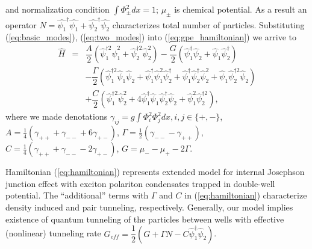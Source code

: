 \documentclass[aps, pre, preprint, groupedaddress, superscriptaddress, showkeys, showpacs] {revtex4-1}
\begin{document}
{{{%
%
and normalization condition $\int \Phi_{\pm}^2 dx = 1$; $\mu_{\pm}$ is chemical potential.
As a result an operator $N=\hat{\psi_1}^\dag\hat{\psi_1} + \hat{\psi_2}^\dag\hat{\psi_2}$ characterizes total number of particles.
Substituting (\ref{eq:basic_modes}), (\ref{eq:two_modes}) into (\ref{eq:gpe_hamiltonian}) we arrive to
% 
\begin{equation}
\begin{array}{lcl}
\hat{H} & = & \dfrac{A}{2} (\hat{\psi}_1^{\dag 2} \hat{\psi}_1^2 + \hat{\psi}_2^{\dag 2} \hat{\psi}_2^2) - \dfrac{G}{2} (\hat{\psi}_1^\dag \hat{\psi}_2 + \hat{\psi}_1 \hat{\psi}_2^\dag) \\ [8pt]
& & -\dfrac{\Gamma}{2} (\hat{\psi}_1^{\dag 2} \hat{\psi}_1 \hat{\psi}_2 + \hat{\psi}_1^\dag \hat{\psi}_1^2 \hat{\psi}_2^\dag + \hat{\psi}_1^\dag \hat{\psi}_2^\dag \hat{\psi}_2^2 + \hat{\psi}_1 \hat{\psi}_2^{\dag 2} \hat{\psi}_2) \\ [8pt]
& & +\dfrac{C}{2} (\hat{\psi}_1^{\dag 2} \hat{\psi}_2^2 + 4 \hat{\psi}_1^\dag \hat{\psi}_1 \hat{\psi}_2^\dag \hat{\psi}_2 + \hat{\psi}_1^2 \hat{\psi}_2^{\dag 2}),
\end{array}
\label{eq:hamiltonian}
\end{equation}
%
where we made denotations $\gamma_{ij} = g \int \Phi_i^2 \Phi_j^2 dx, i,j \in \{+,-\}$,
$A = \frac{1}{4} (\gamma_{++} + \gamma_{--} + 6 \gamma_{+-})$, $\Gamma = \frac{1}{2} (\gamma_{--} - \gamma_{++})$, $C = \frac{1}{4} (\gamma_{++} + \gamma_{--} - 2\gamma_{+-})$, $G = \mu_- - \mu_+ - 2\Gamma$.

Hamiltonian (\ref{eq:hamiltonian}) represents extended model for internal Josephson junction effect with exciton polariton condensates trapped in double-well potential.
The ``additional'' terms with $\Gamma$ and $C$ in (\ref{eq:hamiltonian}) characterize density induced and pair tunneling, respectively.
Generally, our model implies existence of quantum tunneling of the particles between wells with effective (nonlinear) tunneling rate $G_{eff} = \dfrac{1}{2}(G+\Gamma N - C\hat{\psi}_1^\dag\hat{\psi}_2)$.

}}}
\end{document}
